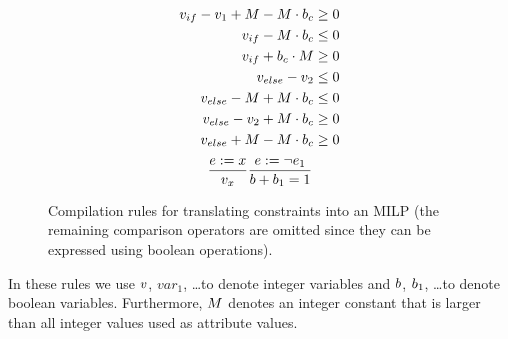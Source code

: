 {\begin{figure}[t]
\begin{minipage}{0.49\linewidth}
\[{\begin{aligned}
        v_{if} - v_1 + M - M \cdot b_{c}   & \geq 0 \\
        v_{if} - M  \cdot b_{c}                      & \leq 0 \\
        v_{if} + b_{c}  \cdot M                      & \geq 0 \\
        v_{else} - v_2                                       & \leq 0 \\
        v_{else} - M + M \cdot b_{c}          & \leq 0 \\
        v_{else} - v_2 + M \cdot b_{c}            & \geq 0 \\
        v_{else} + M - M \cdot b_{c}          & \geq 0
      \end{aligned}
    }
  \]
  \begin{gather*}
    \frac{e := x}{v_{x}}
     \frac{e := \neg e_1 }{
      b + b_1 =1
    }
  \end{gather*}
  \end{minipage}

  \caption{Compilation rules for translating constraints into an MILP (the remaining comparison operators are omitted since they can be expressed using boolean operations).}
  \label{fig:milp-compilation}
\end{figure}

In these rules we use $v$, $var_1$, \ldots to denote integer variables and $b$, $b_1$, \ldots to denote boolean variables. Furthermore, $M$ denotes an integer constant that is larger than all integer values used as attribute values.
}


